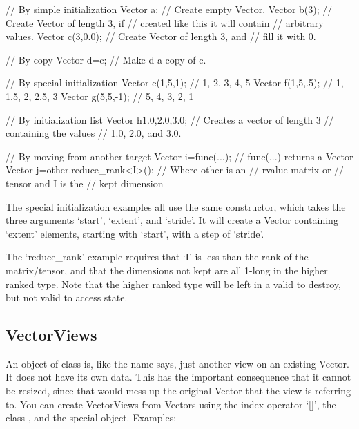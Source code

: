\begin{code}
// By simple initialization
Vector a;         // Create empty Vector.
Vector b(3);      // Create Vector of length 3, if
                  // created like this it will contain
                  // arbitrary values.
Vector c(3,0.0);  // Create Vector of length 3, and
                  // fill it with 0.

// By copy
Vector d=c;       // Make d a copy of c.

// By special initialization
Vector e(1,5,1);  // 1, 2, 3, 4, 5
Vector f(1,5,.5); // 1, 1.5, 2, 2.5, 3
Vector g(5,5,-1); // 5, 4, 3, 2, 1

// By initialization list
Vector h{1.0,2.0,3.0};  // Creates a vector of length 3
                        // containing the values
                        // 1.0, 2.0, and 3.0.

// By moving from another target
Vector i=func(...);  // func(...) returns a Vector
Vector j=other.reduce_rank<I>();  // Where other is an
                                  // rvalue matrix or
                                  // tensor and I is the
                                  // kept dimension
\end{code}

The special initialization examples all use the same constructor, which takes
the three arguments `start', `extent', and `stride'. It will create a
Vector containing `extent' elements, starting with `start', with a
step of `stride'.

The `reduce\_rank' example requires that `I' is less than the rank of the matrix/tensor,
and that the dimensions not kept are all 1-long in the higher ranked type.  Note that the
higher ranked type will be left in a valid to destroy, but not valid to access state.

\subsection{VectorViews}
\label{sec:vector_views}

An object of class  is, like the name says, just
another view on an existing Vector. It does not have its own
data. This has the important consequence that it cannot be resized,
since that would mess up the original Vector that the view is
referring to. You can create VectorViews from Vectors using the index
operator `[]', the class , and the special 
object. Examples:

